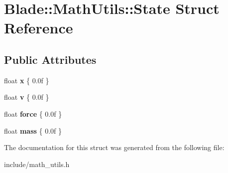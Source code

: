 \hypertarget{struct_blade_1_1_math_utils_1_1_state}{}\section{Blade\+:\+:Math\+Utils\+:\+:State Struct Reference}
\label{struct_blade_1_1_math_utils_1_1_state}
\subsection*{Public Attributes}
\begin{DoxyCompactItemize}
\item 
\mbox{\label{struct_blade_1_1_math_utils_1_1_state_a483857fc60ca822f6ca00be698048a50}} 
float {\bfseries x} \{ 0.\+0f \}
\item 
\mbox{\label{struct_blade_1_1_math_utils_1_1_state_a660adc13b182516c354b40313d758443}} 
float {\bfseries v} \{ 0.\+0f \}
\item 
\mbox{\label{struct_blade_1_1_math_utils_1_1_state_acafe16ae86b8aa1b71df517c3346f45d}} 
float {\bfseries force} \{ 0.\+0f \}
\item 
\mbox{\label{struct_blade_1_1_math_utils_1_1_state_a8bfee3175a77d375014ed3609df68aa1}} 
float {\bfseries mass} \{ 0.\+0f \}
\end{DoxyCompactItemize}


The documentation for this struct was generated from the following file\+:\begin{DoxyCompactItemize}
\item 
include/math\+\_\+utils.\+h\end{DoxyCompactItemize}
